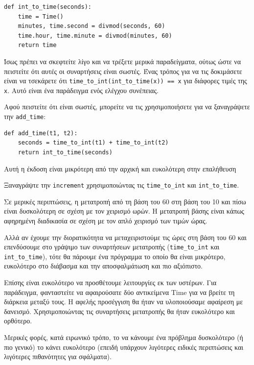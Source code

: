 \documentclass[10pt]{book}
\begin{document}
\begin{verbatim}
def int_to_time(seconds):
    time = Time()
    minutes, time.second = divmod(seconds, 60)
    time.hour, time.minute = divmod(minutes, 60)
    return time
\end{verbatim}
%
 Ίσως πρέπει να σκεφτείτε λίγο και να τρέξετε μερικά παραδείγματα, ούτως ώστε να πειστείτε ότι αυτές οι συναρτήσεις είναι σωστές.  Ένας τρόπος για να τις δοκιμάσετε είναι να τσεκάρετε ότι  \verb"time_to_int(int_to_time(x)) == x"  για διάφορες τιμές της  {\tt x}.  Αυτό είναι ένα παράδειγμα ενός ελέγχου συνέπειας.

Αφού πειστείτε ότι είναι σωστές, μπορείτε να τις χρησιμοποιήσετε για να ξαναγράψετε την  
\verb"add_time":

\begin{verbatim}
def add_time(t1, t2):
    seconds = time_to_int(t1) + time_to_int(t2)
    return int_to_time(seconds)
\end{verbatim}
%
 Αυτή η έκδοση είναι μικρότερη από την αρχική και ευκολότερη στην επαλήθευση

\begin{exercise}

Ξαναγράψτε την  {\tt increment}  χρησιμοποιώντας τις  \verb"time_to_int"  και  \verb"int_to_time".
\end{exercise}

Σε μερικές περιπτώσεις, η μετατροπή από τη βάση του 60 στη βάση του 10 και πίσω είναι δυσκολότερη σε σχέση με τον χειρισμό 
ωρών.  Η μετατροπή βάσης είναι κάπως αφηρημένη διαδικασία σε σχέση με τον απλό χειρισμό των τιμών ώρας.

Αλλά αν έχουμε την διορατικότητα να μεταχειριστούμε τις ώρες στη βάση του 60 και επενδύσουμε στο γράψιμο των συναρτήσεων 
μετατροπής  (\verb"time_to_int"  και  \verb"int_to_time"),  τότε θα πάρουμε ένα πρόγραμμα το οποίο θα είναι μικρότερο, ευκολότερο στο διάβασμα και την αποσφαλμάτωση και πιο αξιόπιστο.

Επίσης είναι ευκολότερο να προσθέτουμε λειτουργίες εκ των υστέρων.  Για παράδειγμα, φανταστείτε να αφαιρούσατε δύο αντικείμενα  Time  για να βρείτε τη διάρκεια μεταξύ τους. Η αφελής προσέγγιση θα ήταν να υλοποιούσαμε αφαίρεση με δανεισμό. Χρησιμοποιώντας τις συναρτήσεις μετατροπής θα ήταν ευκολότερο και ορθότερο.

Μερικές φορές, κατά ειρωνικό τρόπο, το να κάνουμε ένα πρόβλημα δυσκολότερο (ή πιο γενικό) το κάνει ευκολότερο (επειδή υπάρχουν λιγότερες ειδικές περιπτώσεις και λιγότερες πιθανότητες για σφάλματα).
\end{document}
